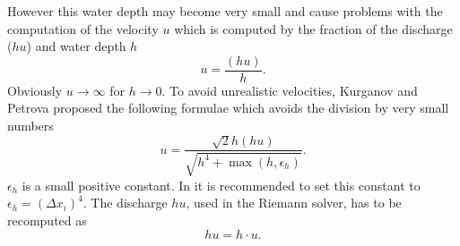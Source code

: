 However this water depth may become very small and cause problems with the computation of 
the velocity $u$ which is computed by the fraction of the discharge ($hu$) and water depth $h$ 
\begin{equation}
u=\frac{(hu)}{h}. 
\end{equation}
Obviously $u\rightarrow\infty$ for $h\rightarrow 0$. To avoid unrealistic velocities, 
Kurganov and Petrova \cite{kurg2} proposed the following formulae which 
avoids the division by very small numbers
\begin{equation}\label{formVel}
u=\frac{\sqrt{2}h(hu)}{\sqrt{h^4+\max(h,\epsilon_h)}}.
\end{equation}
$\epsilon_h$ is a small positive constant. In \cite{kurg2} it is 
recommended to set this constant to $\epsilon_h=(\Delta x_i)^4$.
The discharge $hu$, used in the Riemann solver, has to be recomputed as
\begin{equation}
hu=h\cdot u.
\end{equation}

